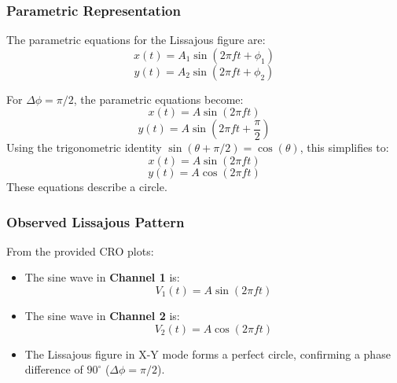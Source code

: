 \documentclass[12pt,a4paper]{report}
\begin{document}
\subsubsection*{Parametric Representation}
The parametric equations for the Lissajous figure are:
\[
x(t) = A_1 \sin(2 \pi f t + \phi_1)
\]
\[
y(t) = A_2 \sin(2 \pi f t + \phi_2)
\]

For \(\Delta \phi = \pi/2\), the parametric equations become:
\[
x(t) = A \sin(2 \pi f t)
\]
\[
y(t) = A \sin(2 \pi f t + \frac{\pi}{2})
\]
Using the trigonometric identity \(\sin(\theta + \pi/2) = \cos(\theta)\), this simplifies to:
\[
x(t) = A \sin(2 \pi f t)
\]
\[
y(t) = A \cos(2 \pi f t)
\]
These equations describe a circle.

\subsubsection*{Observed Lissajous Pattern}
From the provided CRO plots:
\begin{itemize}
    \item The sine wave in \textbf{Channel 1} is:
    \[
    V_1(t) = A \sin(2 \pi f t)
    \]
    \item The sine wave in \textbf{Channel 2} is:
    \[
    V_2(t) = A \cos(2 \pi f t)
    \]
    \item The Lissajous figure in X-Y mode forms a perfect circle, confirming a phase difference of \(90^\circ\) (\(\Delta \phi = \pi/2\)).
\end{itemize}
\end{document}
